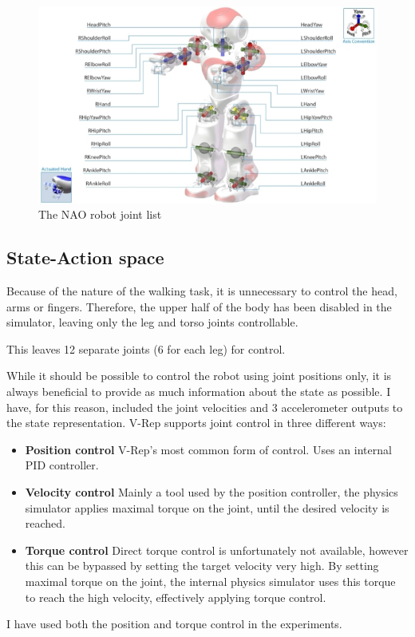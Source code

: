 \begin{figure}[htbp]
\includegraphics[width=.9\textwidth]{images/robsim/nao_joints.jpg}
\caption{The NAO robot joint list\protect\footnotemark}
\label{fig:nao}
\end{figure}


\subsection{State-Action space}
Because of the nature of the walking task, it is unnecessary to control the head, arms or fingers. Therefore, the upper half of the body has been disabled in the simulator, leaving only the leg and torso joints controllable.

This leaves 12 separate joints (6 for each leg) for control.

While it should be possible to control the robot using joint positions only, it is always beneficial to provide as much information about the state as possible. I have, for this reason, included the joint velocities and 3 accelerometer outputs to the state representation.
\medskip
V-Rep supports joint control in three different ways:
\begin{itemize}
\item \textbf{Position control} V-Rep's most common form of control. Uses an internal PID controller. 
\item \textbf{Velocity control} Mainly a tool used by the position controller, the physics simulator applies maximal torque on the joint, until the desired velocity is reached.
\item \textbf{Torque control} Direct torque control is unfortunately not available, however this can be bypassed by setting the target velocity very high. By setting maximal torque on the joint, the internal physics simulator uses this torque to reach the high velocity, effectively applying torque control.
\end{itemize}

I have used both the position and torque control in the experiments.
